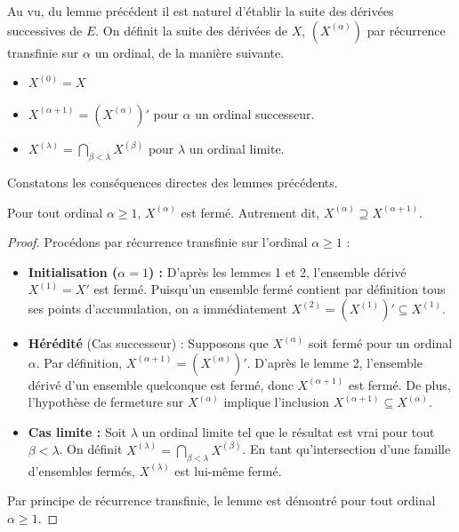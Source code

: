 \medskip

\noindent Au vu, du lemme précédent il est naturel d'établir la suite des dérivées successives de $E$. On définit la suite des dérivées de $X$, $\left(X^{(\alpha)}\right)$ par récurrence transfinie sur $\alpha$ un ordinal, de la manière suivante.
\begin{itemize}[label=\textbullet, nosep, leftmargin=1.5cm, topsep=2pt]
\item $X^{(0)}=X$
\item $X^{(\alpha+1)}=\left(X^{(\alpha)}\right)'$ pour $\alpha$ un ordinal successeur.
\item $X^{(\lambda)}= \bigcap_{\beta<\lambda}X^{(\beta)}$ pour $\lambda$ un ordinal limite.
\end{itemize}
Constatons les conséquences directes des lemmes précédents.

\begin{lemme}
    Pour tout ordinal $\alpha \ge 1 $, $X^{(\alpha)}$ est fermé. Autrement dit, $X^{(\alpha)}\supseteq X^{(\alpha +1)}$.
\end{lemme}

\begin{proof}
Procédons par récurrence transfinie sur l'ordinal $\alpha \ge 1$ :
\begin{itemize}[label=\textbullet]
    \item \textbf{Initialisation ($\alpha = 1$) :} D'après les lemmes 1 et 2, l'ensemble dérivé $X^{(1)} = X'$ est fermé. Puisqu'un ensemble fermé contient par définition tous ses points d'accumulation, on a immédiatement $X^{(2)} = (X^{(1)})' \subseteq X^{(1)}$.
    
    \item \textbf{Hérédité} (Cas successeur) : Supposons que $X^{(\alpha)}$ soit fermé pour un ordinal $\alpha$. Par définition, $X^{(\alpha+1)} = (X^{(\alpha)})'$. D'après le lemme 2, l'ensemble dérivé d'un ensemble quelconque est fermé, donc $X^{(\alpha+1)}$ est fermé. De plus, l'hypothèse de fermeture sur $X^{(\alpha)}$ implique l'inclusion $X^{(\alpha+1)} \subseteq X^{(\alpha)}$.
    
    \item \textbf{Cas limite :} Soit $\lambda$ un ordinal limite tel que le résultat est vrai pour tout $\beta < \lambda$. On définit $X^{(\lambda)} = \bigcap_{\beta < \lambda} X^{(\beta)}$. En tant qu'intersection d'une famille d'ensembles fermés, $X^{(\lambda)}$ est lui-même fermé. 
\end{itemize}
Par principe de récurrence transfinie, le lemme est démontré pour tout ordinal $\alpha \ge 1$.
\end{proof}


